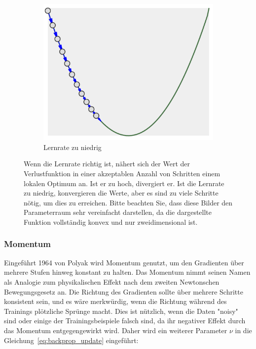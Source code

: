 \begin{figure}
\begin{subfigure}[b]{0.3\textwidth}
        \includegraphics[width=\textwidth]{images/lr_too_low.png}
        \caption{Lernrate zu niedrig}
        \label{fig:lr_too-low}
    \end{subfigure}
    \caption{Wenn die Lernrate richtig ist, nähert sich der Wert der Verlustfunktion in einer akzeptablen Anzahl von Schritten einem lokalen Optimum an.
    Ist er zu hoch, divergiert er.
    Ist die Lernrate zu niedrig, konvergieren die Werte, aber es sind zu viele Schritte nötig, um dies zu erreichen.
    Bitte beachten Sie, dass diese Bilder den Parameterraum sehr vereinfacht darstellen, da die dargestellte Funktion vollständig konvex und nur zweidimensional ist.}
    \label{fig:learning_rate}
\end{figure}

\subsubsection{Momentum}

Eingeführt 1964 von Polyak \cite{Polyak1964} wird Momentum genutzt, um den Gradienten über mehrere Stufen hinweg konstant zu halten.
Das Momentum nimmt seinen Namen als Analogie zum physikalischen Effekt nach dem zweiten Newtonschen Bewegungsgesetz an.
Die Richtung des Gradienten sollte über mehrere Schritte konsistent sein, und es wäre merkwürdig, wenn die Richtung während des Trainings plötzliche Sprünge macht.
Dies ist nützlich, wenn die Daten "noisy" sind oder einige der Trainingsbeispiele falsch sind, da ihr negativer Effekt durch das Momentum entgegengewirkt wird.
Daher wird ein weiterer Parameter $\nu$ in die Gleichung~\eqref{eq:backprop_update} eingeführt:

